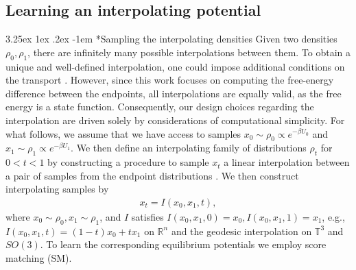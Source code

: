 \documentclass[%
onecolumn,
superscriptaddress,
nofootinbib,
amsmath,amssymb,
table
]{revtex4-2}
\makeatletter
\renewcommand\paragraph{%
  \@startsection{paragraph}{4}{\z@}%
    {3.25ex \@plus1ex \@minus.2ex}%
    {-1em}%
    {\normalfont\normalsize\bfseries}%
}
\makeatother
\begin{document}
\subsection*{Learning an interpolating potential}
\paragraph*{Sampling the interpolating densities}
Given two densities $\rho_0, \rho_1$, there are infinitely many possible interpolations between them. To obtain a unique and well-defined interpolation, one could impose additional conditions on the transport \cite{villani2009optimal,schrodinger1932theorie}. However, since this work focuses on computing the free-energy difference between the endpoints, all interpolations are equally valid, as the free energy is a state function. Consequently, our design choices regarding the interpolation are driven solely by considerations of computational simplicity. For what follows, we assume that we have access to samples $x_0\sim \rho_0  \propto e^{-\beta U_0}$ and $x_1 \sim \rho_1  \propto e^{-\beta U_1}$. We then define an interpolating family of distributions $\rho_t$ for $0<t<1$ by constructing a procedure to sample $x_t$ a linear interpolation between a pair of samples from the endpoint distributions \citep{albergo2023buildingnormalizingflowsstochastic,albergo2023stochasticinterpolantsunifyingframework,lipman2022flow}. 
We then construct interpolating samples by
\begin{align}
    \label{eq:stoch_int}
    x_t = I(x_0,x_1,t),
\end{align}
where $x_0 \sim \rho_0,x_1 \sim \rho_1$, and $I$ satisfies $I(x_0,x_1,0)=x_0,I(x_0,x_1,1)=x_1$, e.g., $I(x_0,x_1,t) = (1-t)x_0+tx_1$ on $\mathbb R^n$ and the geodesic interpolation on $\mathbb T^{3}$ and $ SO(3)$. To learn the corresponding equilibrium potentials we employ score matching (SM).
\end{document}
